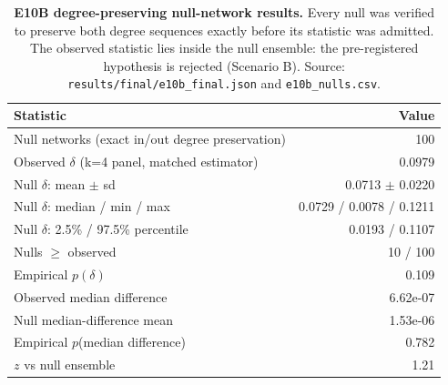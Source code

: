 \begin{table}[htbp]
\centering
\small
\caption{\textbf{E10B degree-preserving null-network results.} Every null was verified to preserve both degree sequences exactly before its statistic was admitted. The observed statistic lies inside the null ensemble: the pre-registered hypothesis is rejected (Scenario B). Source: \texttt{results/final/e10b\_final.json} and \texttt{e10b\_nulls.csv}.}\label{tab:nulls}
\begin{tabular}{lr}
\hline
\textbf{Statistic} & \textbf{Value} \\
\hline
Null networks (exact in/out degree preservation) & 100 \\
Observed $\delta$ (k=4 panel, matched estimator) & 0.0979 \\
Null $\delta$: mean $\pm$ sd & 0.0713 $\pm$ 0.0220 \\
Null $\delta$: median / min / max & 0.0729 / 0.0078 / 0.1211 \\
Null $\delta$: 2.5\% / 97.5\% percentile & 0.0193 / 0.1107 \\
Nulls $\geq$ observed & 10 / 100 \\
Empirical $p(\delta)$ & 0.109 \\
Observed median difference & 6.62e-07 \\
Null median-difference mean & 1.53e-06 \\
Empirical $p$(median difference) & 0.782 \\
$z$ vs null ensemble & 1.21 \\
\hline
\end{tabular}
\end{table}
